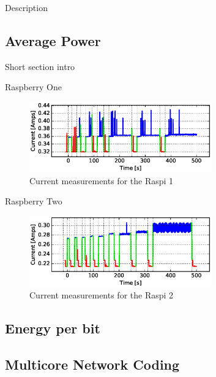 Description

\subsection{Average Power}
Short section intro

Raspberry One
\begin{figure}[ht!]
\centering
\includegraphics[width=0.7\textwidth]{images/current_vs_sec_raspberry_change_gen_from_-10sec_to_500sec.eps}
\caption{Current measurements for the \ac{Raspi} 1}
\label{current_rasp2}
\end{figure}

Raspberry Two
\begin{figure}[ht!]
\centering
\includegraphics[width=0.7\textwidth]{images/current_vs_sec_raspberry2_change_gen_from_-10sec_to_500sec.eps}
\caption{Current measurements for the \ac{Raspi} 2}
\label{current_rasp2}
\end{figure}

\subsection{Energy per bit}


\subsection{Multicore Network Coding}
\label{subs:multicore-network-coding}

